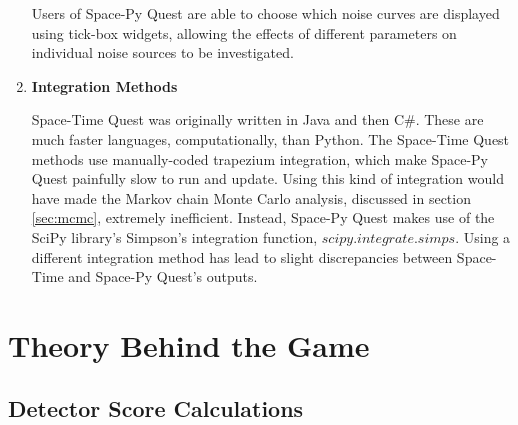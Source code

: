 \documentclass{article}
\begin{document}
\begin{enumerate}
    Users of Space-Py Quest are able to choose which noise curves are displayed using tick-box widgets, allowing the effects of different parameters on individual noise sources to be investigated.
    \item \textbf{Integration Methods} \par
    Space-Time Quest was originally written in Java and then C\#. These are much faster languages, computationally, than Python. The Space-Time Quest methods use manually-coded trapezium integration, which make Space-Py Quest painfully slow to run and update. Using this kind of integration would have made the Markov chain Monte Carlo analysis, discussed in section \ref{sec:mcmc}, extremely inefficient. Instead, Space-Py Quest makes use of the SciPy library's Simpson's integration function, $scipy.integrate.simps$. Using a different integration method has lead to 
slight discrepancies between Space-Time and Space-Py Quest's outputs.
\end{enumerate}

\clearpage
\section{Theory Behind the Game}
\label{sec:theory}
\subsection{Detector Score Calculations}
\end{document}
